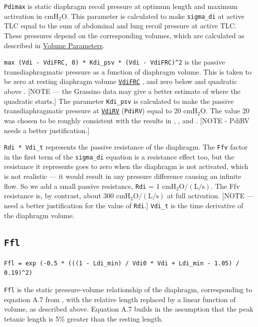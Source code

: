 \documentclass[12pt,openany,oneside]{book}
\begin{document}
\verb~Pdimax~ is static diaphragm recoil pressure at
optimum length and maximum activation in $\mathrm{cmH_2O}$.  This parameter is
calculated to make \verb~sigma_di~ at active TLC equal to the sum of
abdominal and lung recoil pressure at active TLC.  These pressures
depend on the corresponding volumes, which are calculated as
described in \hyperref[Volume Parameters]{Volume Parameters}.

\verb~max (Vdi - VdiFRC, 0) * Kdi_psv * (Vdi - VdiFRC)^2~ is the
passive transdiaphragmatic pressure as a function of diaphragm volume.
This is taken to be zero at resting diaphragm volume
\hyperref[Volume Parameters]{\texttt{VdiFRC}}
\citep{Agostoni01111960}, and zero below and quadratic above
\citep{Reid01091987}. [NOTE --- the Grassino data may give a better
estimate of where the quadratic starts.]  The parameter \verb~Kdi_psv~
is calculated to make the passive transdiaphragmatic pressure at
\hyperref[Volume Parameters]{\texttt{VdiRV}} (\verb~PdiRV~) equal to
20 $\mathrm{cmH_2O}$.  The value 20 was chosen to be roughly
consistent with the results in \citet{Siafakas01071979},
\citet{Grassino01061978}, and \citet{Agostoni01011966}.  [NOTE -
PdiRV needs a better justification.]

\verb~Rdi * Vdi_t~ represents the passive resistance of the diaphragm.
The \verb~Ffv~ factor in the first term of the \verb~sigma_di~
equation is a resistance effect too, but the resistance it represents
goes to zero when the diaphragm is not activated, which is not
realistic --- it would result in any pressure difference causing an
infinite flow.  So we add a small passive resistance, \verb~Rdi~ = 1
$\mathrm{cmH_2O/(L/s)}$.  The Ffv resistance is, by contrast, about
300 $\mathrm{cmH_2O/(L/s)}$ at full activation. [NOTE --- need a better
justification for the value of \verb~Rdi~.]  \verb~Vdi_t~ is the time
derivative of the diaphragm volume.

\subsection{\texttt{Ffl}}
\begin{verbatim}
Ffl = exp (-0.5 * (((1 - Ldi_min) / Vdi0 * Vdi + Ldi_min - 1.05) / 0.19)^2)
\end{verbatim}
\verb~Ffl~ is the static pressure-volume relationship of the
diaphragm, corresponding to equation A.7 from
\citet{Ratnovsky20031771}, with the relative length replaced by a
linear function of volume, as described above.  Equation A.7 builds in
the assumption that the peak tetanic length is 5\% greater than the
resting length.
\end{document}
